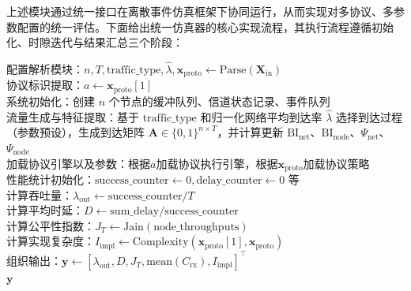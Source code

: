 上述模块通过统一接口在离散事件仿真框架下协同运行，从而实现对多协议、多参数配置的统一评估。下面给出统一仿真器的核心实现流程，其执行流程遵循初始化、时隙迭代与结果汇总三个阶段：

\begin{algorithm}[htbp]
	\caption{统一仿真器执行流程}
	\label{alg:unified_simulator_main}
	
	配置解析模块：$n, T, \text{traffic\_type}, \hat{\lambda}, \mathbf{x}_{\mathrm{proto}} \leftarrow \text{Parse}(\mathbf{X}_{\text{in}})$\\
	协议标识提取：$a \leftarrow \mathbf{x}_{\mathrm{proto}}[1]$\\
	系统初始化：创建 $n$ 个节点的缓冲队列、信道状态记录、事件队列\\
	流量生成与特征提取：基于 $\text{traffic\_type}$ 和归一化网络平均到达率 $\hat{\lambda}$ 选择到达过程（参数预设），生成到达矩阵 $\mathbf{A}\in\{0,1\}^{n\times T}$，并计算更新 $\mathrm{BI}_{\mathrm{net}}$、$\mathrm{BI}_{\mathrm{node}}$、$\Psi_{\mathrm{net}}$、$\Psi_{\mathrm{node}}$\\
	加载协议引擎以及参数：根据$a$加载协议执行引擎，根据$\mathbf{x}_{\mathrm{proto}}$加载协议策略\\

	性能统计初始化：$\text{success\_counter} \leftarrow 0, \text{delay\_counter} \leftarrow 0$ 等\\
	计算吞吐量：$\lambda_{\mathrm{out}} \leftarrow \text{success\_counter} / T$\\
	计算平均时延：$D \leftarrow \text{sum\_delay} / \text{success\_counter}$\\
	计算公平性指数：$J_T \leftarrow \text{Jain}(\text{node\_throughputs})$\\
	计算实现复杂度：$I_{\mathrm{impl}} \leftarrow \text{Complexity}(\mathbf{x}_{\mathrm{proto}}[1], \mathbf{x}_{\mathrm{proto}})$\\
	组织输出：$\mathbf{y} \leftarrow [\lambda_{\mathrm{out}}, D, J_T, \text{mean}(C_{\mathrm{rx}}), I_{\mathrm{impl}}]^{\top}$\\
	\Return $\mathbf{y}$
\end{algorithm}

